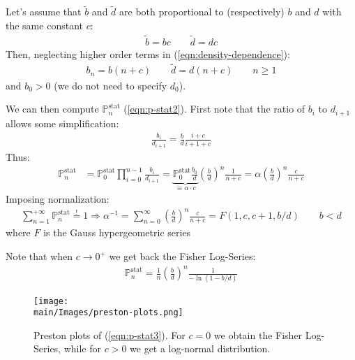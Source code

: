 \documentclass[../../main.tex]{subfiles}
\begin{document}
\medskip

Let's assume that $\tilde{b}$ and $\tilde{d}$ are both proportional to (respectively) $b$ and $d$ with the same constant $c$:
\begin{align*}
    \tilde{b} = b c \qquad \tilde{d} = dc
\end{align*}
Then, neglecting higher order terms in (\ref{eqn:density-dependence}):
\begin{align*}
    b_n = b (n + c) \qquad \tilde{d} = d(n+c) \qquad n\geq 1
\end{align*}
and $b_0 > 0$ (we do not need to specify $d_0$). 

\medskip

We can then compute $\mathbb{P}_n^{\mathrm{stat}}$ (\ref{eqn:p-stat2}). First note that the ratio of $b_i$ to $d_{i+1}$ allows some simplification:
\begin{align*}
    \frac{b_i}{d_{i+1}} = \frac{b}{d} \frac{i+c}{i+1+c}  
\end{align*}
Thus: %
\begin{align}\label{eqn:p-stat3}
    \mathbb{P}_n^{\mathrm{stat}} &= \mathbb{P}_0^{\mathrm{stat}} \prod_{i=0}^{n-1} \frac{b_i}{d_{i+1}}      = \underbrace{\mathbb{P}_0^{\mathrm{stat}} \frac{b_0}{d}}_{\equiv \alpha \cdot c}  \left(\frac{b}{d} \right)^n \frac{1}{n+c} = \alpha \left(\frac{b}{d} \right)^n \frac{c}{n+c} 
\end{align}
Imposing normalization:
\begin{align*}
    \sum_{n=1}^{+\infty} \mathbb{P}_n^{\mathrm{stat}} \overset{!}{=} 1 \Rightarrow \alpha^{-1} = \sum_{n=0}^\infty \left(\frac{b}{d} \right)^n \frac{c}{n+c} = F(1,c,c+1,b/d) \qquad b < d 
\end{align*}%
where $F$ is the Gauss hypergeometric series %

Note that when $c \to 0^+$ we get back the Fisher Log-Series:
\begin{align*}
    \mathbb{P}_{n}^{\mathrm{stat}} = \frac{1}{n}\left(\frac{b}{d} \right)^n \frac{1}{-\ln (1-b/d)} 
\end{align*}

\begin{figure}[H]
    \centering
    \texttt{[image: \\main/Images/preston-plots.png]}
    \caption{Preston plots of (\ref{eqn:p-stat3}). For $c=0$ we obtain the Fisher Log-Series, while for $c > 0$ we get a log-normal distribution.}
    \label{fig:preston-plots}
\end{figure}
\end{document}
